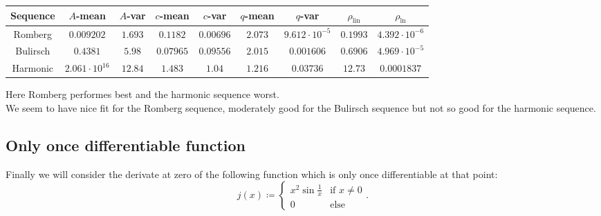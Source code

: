 \begin{table}[H]
    \centering
    \small
    \begin{tabular}{c||c|c|c|c|c|c|c|c}
Sequence & \(A\)-mean & \(A\)-var & \(c\)-mean & \(c\)-var & \(q\)-mean & \(q\)-var & \(\rho_{\operatorname{lin}}\) & \(\rho_{\ln}\)\\\hline
\rowcolor{green}
Romberg & \(0.009202\) & \(1.693\) & \(0.1182\) & \(0.00696\) & \(2.073\) & \(9.612\cdot 10^{-5}\) & \(0.1993\) & \(4.392\cdot 10^{-6}\) \\
\rowcolor{yellow}
Bulirsch & \(0.4381\) & \(5.98\) & \(0.07965\) & \(0.09556\) & \(2.015\) & \(0.001606\) & \(0.6906\) & \(4.969\cdot 10^{-5}\) \\
\rowcolor{red}
Harmonic & \(2.061\cdot 10^{16}\) & \(12.84\) & \(1.483\) & \(1.04\) & \(1.216\) & \(0.03736\) & \(12.73\) & \(0.0001837\) \\
    \end{tabular}
    \label{tab:my_label}
\end{table}

Here Romberg performes best and the harmonic sequence worst.\\

We seem to have nice fit for the Romberg sequence, moderately good for the Bulirsch sequence but not so good for the harmonic sequence.

\subsection{Only once differentiable function}

Finally we will consider the derivate at zero of the following function which is only once differentiable at that point:
\[
j(x)\coloneqq \begin{cases}
x^2\sin\frac{1}{x} & \text{if } x \neq 0\\
0 & \text{else}
\end{cases}.
\]

